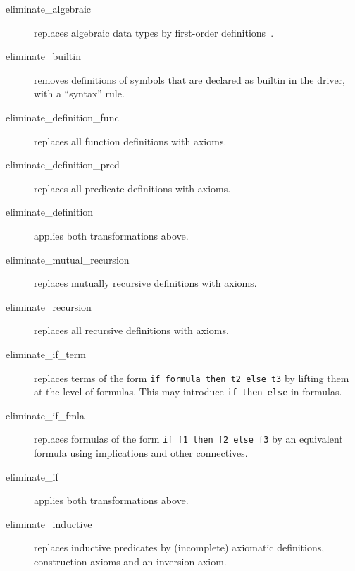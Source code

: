 \begin{description}

\item[eliminate\_algebraic] replaces algebraic data types by first-order
definitions~\cite{paskevich09rr}.

\item[eliminate\_builtin] removes definitions of symbols that are
  declared as builtin in the driver, \ie with a ``syntax'' rule.

\item[eliminate\_definition\_func]
  replaces all function definitions with axioms.

\item[eliminate\_definition\_pred]
  replaces all predicate definitions with axioms.

\item[eliminate\_definition]
  applies both transformations above.

\item[eliminate\_mutual\_recursion]
  replaces mutually recursive definitions with axioms.

\item[eliminate\_recursion]
  replaces all recursive definitions with axioms.

\item[eliminate\_if\_term] replaces terms of the form \texttt{if
    formula then t2 else t3} by lifting them at the level of formulas.
  This may introduce \texttt{if then else} in formulas.

\item[eliminate\_if\_fmla] replaces formulas of the form \texttt{if f1 then f2
  else f3} by an equivalent formula using implications and other
  connectives.

\item[eliminate\_if]
  applies both transformations above.

\item[eliminate\_inductive] replaces inductive predicates by
  (incomplete) axiomatic definitions, \ie construction axioms and
  an inversion axiom.


\end{description}
